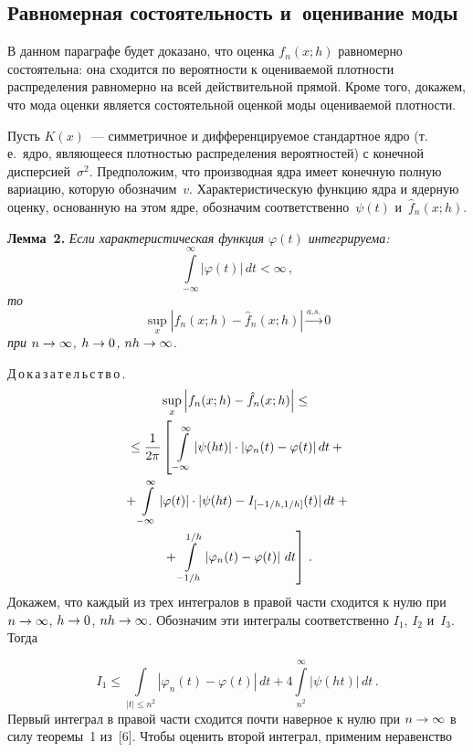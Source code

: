 \begin{multicols}{2}
\section{Равномерная состоятельность и~оценивание моды}

В данном параграфе будет доказано, что оценка $f_n(x;h)$ равномерно
состоятельна:
она сходится по вероятности к оцениваемой плотности распределения
равномерно на всей действительной прямой. Кроме того, докажем,
что мода оценки является состоятельной оценкой моды оцениваемой
плотности.

Пусть $K(x)$~--- симметричное и дифферен\-ци\-ру\-емое стандартное ядро
(т.\,е.\ ядро, являющееся плотностью распределения вероятностей)
с конечной дисперсией~$\sigma^2$. Предположим, что производная
ядра имеет конечную полную вариацию, которую обозначим~$v$.
Характеристическую функцию ядра и ядерную оценку, основанную
на этом ядре, обозначим соответственно~$\psi(t)$ и~$\hat f_n(x;h)$.

\medskip

\noindent
\textbf{Лемма~2.} \textit{Если характеристическая функция $\varphi(t)$
интегрируема:}
$$
\int\limits_{-\infty}^\infty\left\vert\varphi(t)\right\vert\,dt<\infty\,,
$$
\textit{то}
$$\sup\limits_x|f_n(x;h)-\hat f_n(x;h)|\xrightarrow{a.s.} 0$$
\textit{при $n\hm\to\infty$, $h\hm\to0$, $nh\hm\to\infty$}.

\medskip

\noindent
Д\,о\,к\,а\,з\,а\,т\,е\,л\,ь\,с\,т\,в\,о\,.\
\begin{multline*}
\sup\limits_x\left\vert f_n(x;h)-\hat f_n(x;h)\right\vert\le{}\\
{}\le\fr{1}{2\pi}
\left[ \vphantom{\int\limits_{-1/h}^{1/h}}
\int\limits_{-\infty}^\infty|\psi(ht)|\cdot|\varphi_n(t)-\varphi(t)|\,dt+{}\right.\\
\left.{}+
\int\limits_{-\infty}^\infty|\varphi(t)|\cdot|\psi(ht)-I_{[-1/h,1/h]}(t)|\,dt+{}\right.\\
\left.{}+\int\limits_{-1/h}^{1/h}\left\vert \varphi_n(t)-\varphi(t)\right\vert\,dt
\right]\,.
\end{multline*}
Докажем, что каждый из трех интегралов в правой части сходится к нулю
при $n\hm\to\infty$, $h\hm\to0$, $nh\hm\to\infty$. Обозначим эти интегралы соответственно
$I_1$, $I_2$ и~$I_3$. Тогда

\noindent
$$
I_1\le\int\limits_{|t|\le n^2}\left\vert \varphi_n(t)-\varphi(t)\right\vert\,dt+
4\int\limits_{n^2}^\infty|\psi(ht)|\,dt\,.
$$
Первый интеграл в правой части сходится почти наверное к нулю при
$n\hm\to\infty$ в силу теоремы~1 из~[6]. Чтобы оценить второй интеграл,
применим неравенство


\end{multicols}
